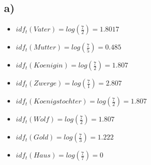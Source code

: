 \documentclass[11pt,a4paper,parskip=half ]{scrartcl}
\begin{document}
	\subsection*{a)}
	\begin{itemize}
		\item $idf_t(Vater) = log(\frac{7}{2}) = 1.8017$
		\item $idf_t(Mutter) = log(\frac{7}{5}) = 0.485$
		\item $idf_t(Koenigin) = log(\frac{7}{2}) = 1.807$
		\item $idf_t(Zwerge) = log(\frac{7}{1}) = 2.807$
		\item $idf_t(Koenigstochter) = log(\frac{7}{2}) = 1.807$
		\item $idf_t(Wolf) = log(\frac{7}{2}) = 1.807$
		\item $idf_t(Gold) = log(\frac{7}{3}) = 1.222$
		\item $idf_t(Haus) = log(\frac{7}{7}) = 0$
	\end{itemize}
\end{document}
